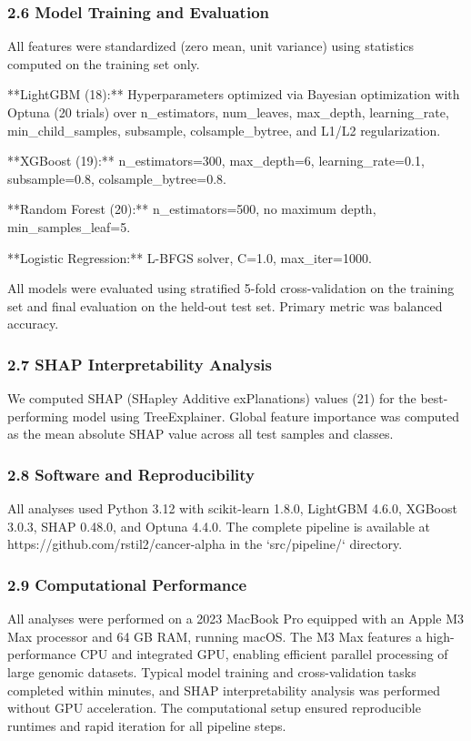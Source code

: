 \subsubsection{2.6 Model Training and
Evaluation}\label{model-training-and-evaluation}

All features were standardized (zero mean, unit variance) using
statistics computed on the training set only.

**LightGBM (18):** Hyperparameters optimized via Bayesian optimization
with Optuna (20 trials) over n\_estimators, num\_leaves, max\_depth,
learning\_rate, min\_child\_samples, subsample, colsample\_bytree, and
L1/L2 regularization.

**XGBoost (19):** n\_estimators=300, max\_depth=6, learning\_rate=0.1,
subsample=0.8, colsample\_bytree=0.8.

**Random Forest (20):** n\_estimators=500, no maximum depth,
min\_samples\_leaf=5.

**Logistic Regression:** L-BFGS solver, C=1.0, max\_iter=1000.

All models were evaluated using stratified 5-fold cross-validation on
the training set and final evaluation on the held-out test set. Primary
metric was balanced accuracy.

\subsubsection{2.7 SHAP Interpretability
Analysis}\label{shap-interpretability-analysis}

We computed SHAP (SHapley Additive exPlanations) values (21) for the
best-performing model using TreeExplainer. Global feature importance was
computed as the mean absolute SHAP value across all test samples and
classes.

\subsubsection{2.8 Software and
Reproducibility}\label{software-and-reproducibility}

All analyses used Python 3.12 with scikit-learn 1.8.0, LightGBM 4.6.0,
XGBoost 3.0.3, SHAP 0.48.0, and Optuna 4.4.0. The complete pipeline is
available at https://github.com/rstil2/cancer-alpha in the
`src/pipeline/` directory.

\subsubsection{2.9 Computational Performance}\label{computational-performance}
All analyses were performed on a 2023 MacBook Pro equipped with an Apple M3 Max processor and 64 GB RAM, running macOS. The M3 Max features a high-performance CPU and integrated GPU, enabling efficient parallel processing of large genomic datasets. Typical model training and cross-validation tasks completed within minutes, and SHAP interpretability analysis was performed without GPU acceleration. The computational setup ensured reproducible runtimes and rapid iteration for all pipeline steps.

